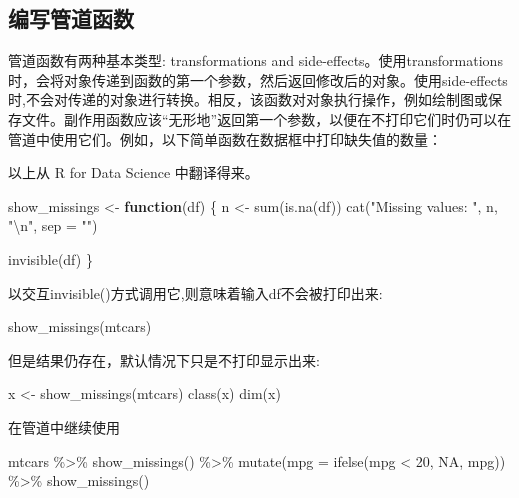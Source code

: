 \documentclass[
]{book}
\newenvironment{Shaded}{\begin{snugshade}}{\end{snugshade}}
\newcommand{\AttributeTok}[1]{\textcolor[rgb]{0.77,0.63,0.00}{#1}}
\newcommand{\ConstantTok}[1]{\textcolor[rgb]{0.00,0.00,0.00}{#1}}
\newcommand{\ControlFlowTok}[1]{\textcolor[rgb]{0.13,0.29,0.53}{\textbf{#1}}}
\newcommand{\DecValTok}[1]{\textcolor[rgb]{0.00,0.00,0.81}{#1}}
\newcommand{\FunctionTok}[1]{\textcolor[rgb]{0.00,0.00,0.00}{#1}}
\newcommand{\NormalTok}[1]{#1}
\newcommand{\OtherTok}[1]{\textcolor[rgb]{0.56,0.35,0.01}{#1}}
\newcommand{\SpecialCharTok}[1]{\textcolor[rgb]{0.00,0.00,0.00}{#1}}
\newcommand{\StringTok}[1]{\textcolor[rgb]{0.31,0.60,0.02}{#1}}
\begin{document}
\hypertarget{ux7f16ux5199ux7ba1ux9053ux51fdux6570}{%
\subsection{编写管道函数}\label{ux7f16ux5199ux7ba1ux9053ux51fdux6570}}

管道函数有两种基本类型: transformations and side-effects。使用transformations时，会将对象传递到函数的第一个参数，然后返回修改后的对象。使用side-effects时,不会对传递的对象进行转换。相反，该函数对对象执行操作，例如绘制图或保存文件。副作用函数应该``无形地''返回第一个参数，以便在不打印它们时仍可以在管道中使用它们。例如，以下简单函数在数据框中打印缺失值的数量：

以上从 R for Data Science 中翻译得来。

\begin{Shaded}
\begin{Highlighting}[]
\NormalTok{show\_missings }\OtherTok{\textless{}{-}} \ControlFlowTok{function}\NormalTok{(df) \{}
\NormalTok{  n }\OtherTok{\textless{}{-}} \FunctionTok{sum}\NormalTok{(}\FunctionTok{is.na}\NormalTok{(df))}
  \FunctionTok{cat}\NormalTok{(}\StringTok{"Missing values: "}\NormalTok{, n, }\StringTok{"}\SpecialCharTok{\textbackslash{}n}\StringTok{"}\NormalTok{, }\AttributeTok{sep =} \StringTok{""}\NormalTok{)}
  
  \FunctionTok{invisible}\NormalTok{(df)}
\NormalTok{\}}
\end{Highlighting}
\end{Shaded}

以交互invisible()方式调用它,则意味着输入df不会被打印出来:

\begin{Shaded}
\begin{Highlighting}[]
\FunctionTok{show\_missings}\NormalTok{(mtcars)}
\end{Highlighting}
\end{Shaded}

但是结果仍存在，默认情况下只是不打印显示出来:

\begin{Shaded}
\begin{Highlighting}[]
\NormalTok{x }\OtherTok{\textless{}{-}} \FunctionTok{show\_missings}\NormalTok{(mtcars) }
\FunctionTok{class}\NormalTok{(x)}
\FunctionTok{dim}\NormalTok{(x)}
\end{Highlighting}
\end{Shaded}

在管道中继续使用

\begin{Shaded}
\begin{Highlighting}[]
\NormalTok{mtcars }\SpecialCharTok{\%\textgreater{}\%} 
  \FunctionTok{show\_missings}\NormalTok{() }\SpecialCharTok{\%\textgreater{}\%} 
  \FunctionTok{mutate}\NormalTok{(}\AttributeTok{mpg =} \FunctionTok{ifelse}\NormalTok{(mpg }\SpecialCharTok{\textless{}} \DecValTok{20}\NormalTok{, }\ConstantTok{NA}\NormalTok{, mpg)) }\SpecialCharTok{\%\textgreater{}\%} 
  \FunctionTok{show\_missings}\NormalTok{() }
\end{Highlighting}
\end{Shaded}
\end{document}
